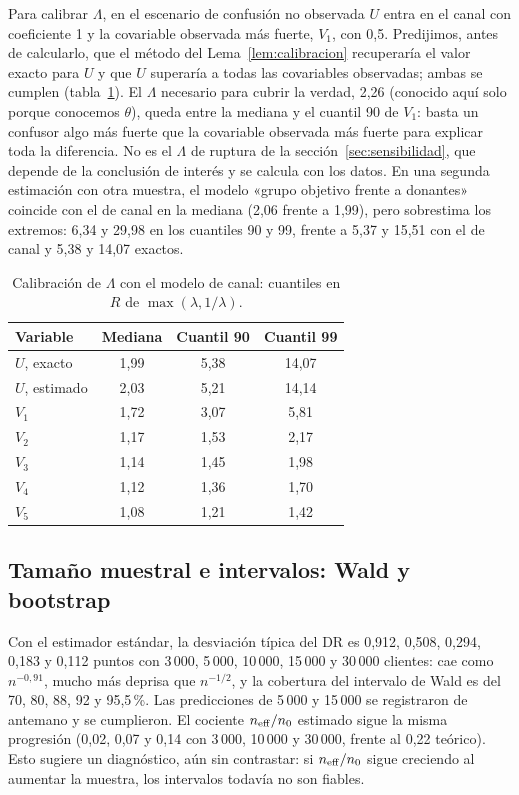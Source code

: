 Para calibrar $\Lambda$, en el escenario de confusión no observada $U$ entra en el canal con coeficiente 1 y la covariable observada más fuerte, $V_1$, con 0,5. Predijimos, antes de calcularlo, que el método del Lema~\ref{lem:calibracion} recuperaría el valor exacto para $U$ y que $U$ superaría a todas las covariables observadas; ambas se cumplen (tabla~\ref{tab:calibracion}). El $\Lambda$ necesario para cubrir la verdad, 2,26 (conocido aquí solo porque conocemos $\theta$), queda entre la mediana y el cuantil 90 de $V_1$: basta un confusor algo más fuerte que la covariable observada más fuerte para explicar toda la diferencia. No es el $\Lambda$ de ruptura de la sección~\ref{sec:sensibilidad}, que depende de la conclusión de interés y se calcula con los datos. En una segunda estimación con otra muestra, el modelo «grupo objetivo frente a donantes» coincide con el de canal en la mediana (2,06 frente a 1,99), pero sobrestima los extremos: 6,34 y 29,98 en los cuantiles 90 y 99, frente a 5,37 y 15,51 con el de canal y 5,38 y 14,07 exactos.

\begin{table}[ht]
\centering\small
\caption{Calibración de $\Lambda$ con el modelo de canal: cuantiles en $R$ de $\max(\lambda,1/\lambda)$.}\label{tab:calibracion}
\begin{tabular}{@{}lccc@{}}
\toprule
Variable & Mediana & Cuantil 90 & Cuantil 99 \\
\midrule
$U$, exacto & 1,99 & 5,38 & 14,07 \\
$U$, estimado & 2,03 & 5,21 & 14,14 \\
$V_1$ & 1,72 & 3,07 & 5,81 \\
$V_2$ & 1,17 & 1,53 & 2,17 \\
$V_3$ & 1,14 & 1,45 & 1,98 \\
$V_4$ & 1,12 & 1,36 & 1,70 \\
$V_5$ & 1,08 & 1,21 & 1,42 \\
\bottomrule
\end{tabular}
\end{table}

\subsection{Tamaño muestral e intervalos: Wald y bootstrap}\label{sec:res-bootstrap}

Con el estimador estándar, la desviación típica del DR es 0,912, 0,508, 0,294, 0,183 y 0,112 puntos con 3\,000, 5\,000, 10\,000, 15\,000 y 30\,000 clientes: cae como $n^{-0,91}$, mucho más deprisa que $n^{-1/2}$, y la cobertura del intervalo de Wald es del 70, 80, 88, 92 y 95,5\,\%. Las predicciones de 5\,000 y 15\,000 se registraron de antemano y se cumplieron. El cociente $n_{\mathrm{eff}}/n_0$ estimado sigue la misma progresión (0,02, 0,07 y 0,14 con 3\,000, 10\,000 y 30\,000, frente al 0,22 teórico). Esto sugiere un diagnóstico, aún sin contrastar: si $n_{\mathrm{eff}}/n_0$ sigue creciendo al aumentar la muestra, los intervalos todavía no son fiables.


